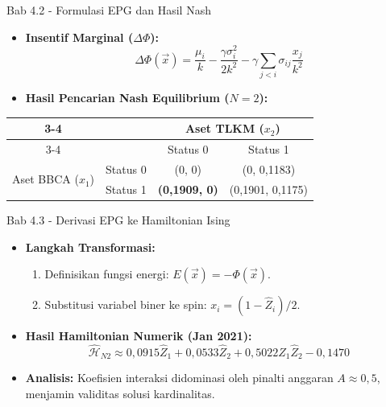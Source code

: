 \begin{frame}{Bab 4.2 - Formulasi EPG dan Hasil Nash}
    \begin{itemize}
        \item \textbf{Insentif Marginal ($\Delta \Phi$):}
        \begin{equation*}
            \Delta \Phi(\vec{x}) = \frac{\mu_i}{k} - \frac{\gamma \sigma_i^2}{2k^2} - \gamma \sum_{j < i} \sigma_{ij} \frac{x_j}{k^2}
        \end{equation*}
        \item \textbf{Hasil Pencarian Nash Equilibrium ($N=2$):}
    \end{itemize}
    \begin{table}
        \footnotesize
        \centering
        \begin{tabular}{cc|c|c|}
        \cline{3-4}
        & & \multicolumn{2}{c|}{Aset TLKM ($x_2$)} \\ \cline{3-4}
        & & Status 0 & Status 1 \\ \hline
        \multicolumn{1}{|c|}{\multirow{2}{*}{Aset BBCA ($x_1$)}} & Status 0 & (0, 0) & (0, 0,1183) \\ \cline{2-4} 
        \multicolumn{1}{|c|}{} & Status 1 & \textbf{(0,1909, 0)} & (0,1901, 0,1175) \\ \hline
        \end{tabular}
    \end{table}
\end{frame}

\begin{frame}{Bab 4.3 - Derivasi EPG ke Hamiltonian Ising}
    \begin{itemize}
        \item \textbf{Langkah Transformasi:}
        \begin{enumerate}
            \item Definisikan fungsi energi: $E(\vec{x}) = -\Phi(\vec{x})$.
            \item Substitusi variabel biner ke spin: $x_i = (1 - \hat{Z}_i)/2$.
        \end{enumerate}
        \item \textbf{Hasil Hamiltonian Numerik (Jan 2021):}
        \begin{equation*}
            \hat{\mathcal{H}}_{N2} \approx 0,0915 \hat{Z}_1 + 0,0533 \hat{Z}_2 + 0,5022 \hat{Z}_1 \hat{Z}_2 - 0,1470
        \end{equation*}
        \item \textbf{Analisis:} Koefisien interaksi didominasi oleh pinalti anggaran $A \approx 0,5$, menjamin validitas solusi kardinalitas.
    \end{itemize}
\end{frame}

